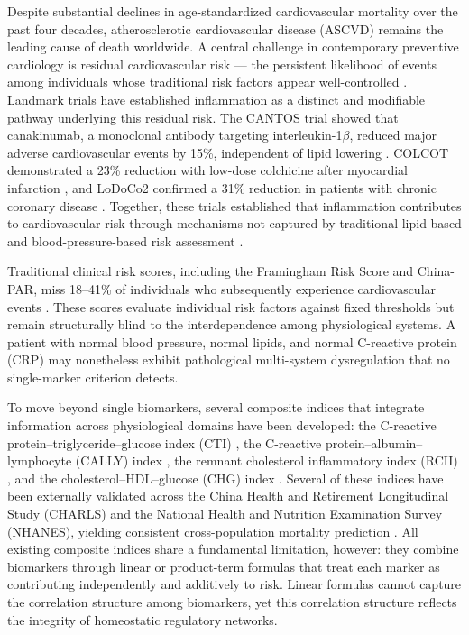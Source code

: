 \documentclass[11pt,a4paper]{article}
\begin{document}
Despite substantial declines in age-standardized cardiovascular mortality over the past four decades, atherosclerotic cardiovascular disease (ASCVD) remains the leading cause of death worldwide. A central challenge in contemporary preventive cardiology is residual cardiovascular risk --- the persistent likelihood of events among individuals whose traditional risk factors appear well-controlled \cite{wulff2025residual}. Landmark trials have established inflammation as a distinct and modifiable pathway underlying this residual risk. The CANTOS trial showed that canakinumab, a monoclonal antibody targeting interleukin-1$\beta$, reduced major adverse cardiovascular events by 15\%, independent of lipid lowering \cite{ridker2017cantos}. COLCOT demonstrated a 23\% reduction with low-dose colchicine after myocardial infarction \cite{tardif2019colcot}, and LoDoCo2 confirmed a 31\% reduction in patients with chronic coronary disease \cite{nidorf2020lodoco2}. Together, these trials established that inflammation contributes to cardiovascular risk through mechanisms not captured by traditional lipid-based and blood-pressure-based risk assessment \cite{ghafoury2025ckm}.

Traditional clinical risk scores, including the Framingham Risk Score and China-PAR, miss 18--41\% of individuals who subsequently experience cardiovascular events \cite{dagostino2008framingham,yang2016chinapar}. These scores evaluate individual risk factors against fixed thresholds but remain structurally blind to the interdependence among physiological systems. A patient with normal blood pressure, normal lipids, and normal C-reactive protein (CRP) may nonetheless exhibit pathological multi-system dysregulation that no single-marker criterion detects.

To move beyond single biomarkers, several composite indices that integrate information across physiological domains have been developed: the C-reactive protein--triglyceride--glucose index (CTI) \cite{tang2024cti}, the C-reactive protein--albumin--lymphocyte (CALLY) index \cite{chen2026cally,han2025callycvd}, the remnant cholesterol inflammatory index (RCII) \cite{wang2025rcii}, and the cholesterol--HDL--glucose (CHG) index \cite{wei2025chg}. Several of these indices have been externally validated across the China Health and Retirement Longitudinal Study (CHARLS) and the National Health and Nutrition Examination Survey (NHANES), yielding consistent cross-population mortality prediction \cite{an2026ctifi}. All existing composite indices share a fundamental limitation, however: they combine biomarkers through linear or product-term formulas that treat each marker as contributing independently and additively to risk. Linear formulas cannot capture the correlation structure among biomarkers, yet this correlation structure reflects the integrity of homeostatic regulatory networks.
\end{document}
